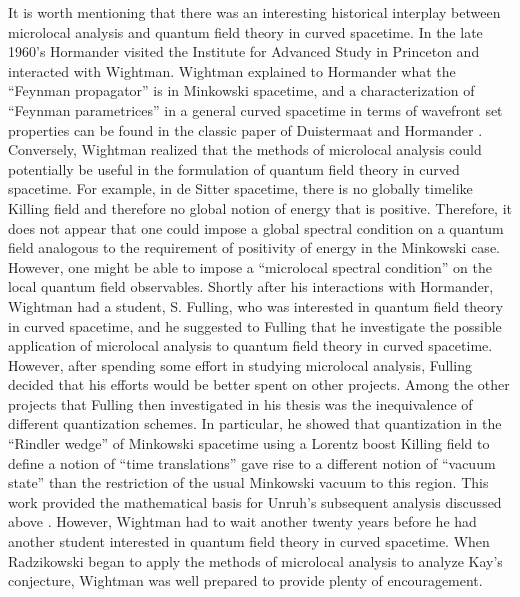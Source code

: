 It is worth mentioning that there was an interesting historical
interplay between microlocal analysis and quantum field theory in
curved spacetime. In the late 1960's Hormander visited the Institute
for Advanced Study in Princeton and interacted with Wightman. Wightman
explained to Hormander what the ``Feynman propagator'' is in Minkowski
spacetime, and a characterization of ``Feynman parametrices'' in a
general curved spacetime in terms of wavefront set properties can be
found in the classic paper of Duistermaat and Hormander
\cite{dh}. Conversely, Wightman realized that the methods of
microlocal analysis could potentially be useful in the formulation of
quantum field theory in curved spacetime. For example, in de Sitter
spacetime, there is no globally timelike Killing field and therefore
no global notion of energy that is positive. Therefore, it does not
appear that one could impose a global spectral condition on a quantum
field analogous to the requirement of positivity of energy in the
Minkowski case. However, one might be able to impose a ``microlocal
spectral condition'' on the local quantum field observables. Shortly
after his interactions with Hormander, Wightman had a student,
S. Fulling, who was interested in quantum field theory in curved
spacetime, and he suggested to Fulling that he investigate the
possible application of microlocal analysis to quantum field theory in
curved spacetime. However, after spending some effort in studying
microlocal analysis, Fulling decided that his efforts would be better
spent on other projects. Among the other projects that Fulling then
investigated in his thesis was the inequivalence of different
quantization schemes. In particular, he showed that quantization in
the ``Rindler wedge'' of Minkowski spacetime using a Lorentz boost
Killing field to define a notion of ``time translations'' gave rise to a
different notion of ``vacuum state'' than the restriction of the usual
Minkowski vacuum to this region. This work provided the mathematical
basis for Unruh's subsequent analysis discussed above
\cite{u2}. However, Wightman had to wait another twenty years before
he had another student interested in quantum field theory in curved
spacetime. When Radzikowski began to apply the methods of microlocal
analysis to analyze Kay's conjecture, Wightman was well prepared to provide
plenty of encouragement.

